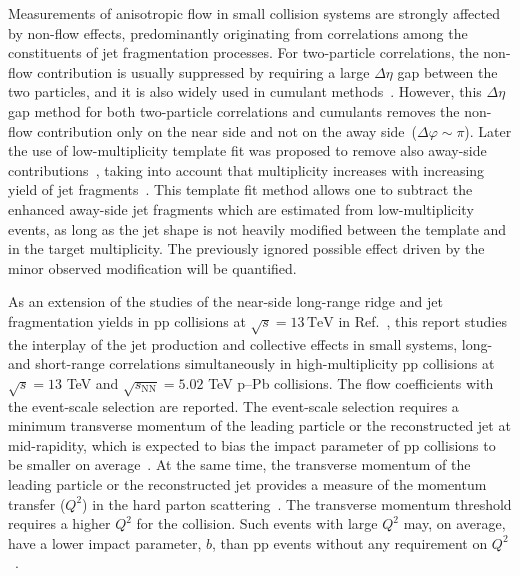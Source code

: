 Measurements of anisotropic flow in small collision systems are strongly affected by non-flow effects, predominantly originating from correlations among the constituents of jet fragmentation processes.
For two-particle correlations, the non-flow contribution is usually suppressed by requiring a large $\Delta\eta$ gap between the two particles,  and it is also widely used in cumulant methods~\cite{Bilandzic:2010jr, Acharya:2019vdf}. However, this $\Delta\eta$ gap method for both two-particle correlations and cumulants removes the non-flow contribution only on the near side and not on the away side~($\Delta\varphi\sim\pi$). Later the use of low-multiplicity template fit was proposed to remove also away-side contributions~\cite{ATLAS:2015hzw,ATLAS:2016yzd,ATLAS:2018ngv}, taking into account that multiplicity increases with increasing yield of jet fragments~\cite{CMS:2013ycn,ALICE:2013tla,ALICE:2014mas}. This template fit method allows one to subtract the enhanced away-side jet fragments which are estimated from low-multiplicity events, as long as the jet shape is not heavily modified between the template and in the target multiplicity. The previously ignored possible effect driven by the minor observed modification will be quantified.

As an extension of the studies of the near-side long-range ridge and jet fragmentation yields in pp collisions at $\sqrt{s}=13\,\mathrm{TeV}$ in Ref.~\cite{ALICE:2021nir}, this report studies the interplay of the jet production and collective effects in small systems, long- and short-range correlations simultaneously in high-multiplicity pp collisions at $\sqrt{s} =13$ TeV and $\sqrt{s_{\mathrm{NN}}}=5.02$ TeV p--Pb collisions. The flow coefficients with the event-scale selection are reported. The event-scale selection requires a minimum transverse momentum of the leading particle or the reconstructed jet at mid-rapidity, which is expected to bias the impact parameter of pp collisions to be smaller on average~\cite{Sjostrand:1986ep,Frankfurt:2003td,Frankfurt:2010ea}. At the same time, the transverse momentum of the leading particle or the reconstructed jet provides a measure of the momentum transfer ($Q^2$) in the hard parton scattering~\cite{Chatrchyan:2012tt, Chatrchyan:2011id}. The transverse momentum threshold requires a higher $Q^2$ for the collision. Such events with large $Q^2$ may, on average, have a lower impact parameter, $b$, than pp events without any requirement on $Q^2$~\cite{Frankfurt:2003td}.

